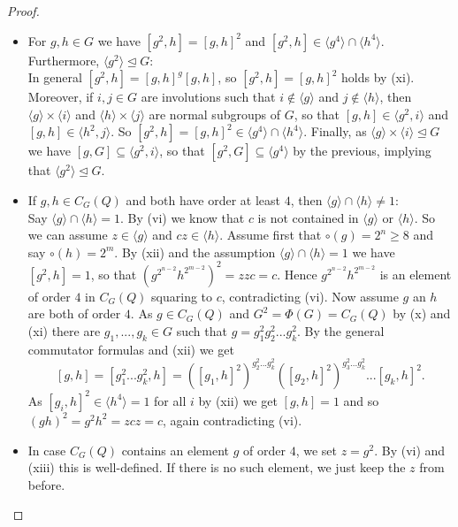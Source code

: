 \documentclass[a4paper,10pt]{amsart}
\theoremstyle{definition}
\theoremstyle{remark}
\begin{document}
\begin{proof}
\begin{itemize}
\item[(xii)] For $g,h \in G$ we have $[g^2,h] = [g,h]^2$ and $[g^2,h] \in \langle g^4 \rangle \cap \langle h^4 \rangle$. Furthermore, $\langle g^2 \rangle \unlhd G$:\\
In general $[g^2,h] = [g,h]^g[g,h]$, so $[g^2,h] = [g,h]^2$ holds by (xi). Moreover, if $i,j \in G$ are involutions such that $i \notin \langle g \rangle$ and $j \notin \langle h \rangle$, then $\langle g \rangle \times \langle i \rangle$ and $\langle h \rangle \times \langle j \rangle$ are normal subgroups of $G$, so that $[g,h] \in \langle g^2, i \rangle$ and $[g,h] \in \langle h^2, j \rangle$. So $[g^2,h] = [g,h]^2 \in \langle g^4 \rangle \cap \langle h^4 \rangle$. Finally, as $\langle g \rangle \times \langle i \rangle \unlhd G$ we have $[g,G] \subseteq \langle g^2, i\rangle$, so that $[g^2,G] \subseteq \langle g^4 \rangle$ by the previous, implying that $\langle g^2 \rangle \unlhd G$.

\item[(xiii)] If $g,h \in C_G(Q)$ and both have order at least $4$, then $\langle g \rangle \cap \langle h \rangle \neq 1$:\\
Say $\langle g \rangle \cap \langle h \rangle =1$. By (vi) we know that $c$ is not contained in $\langle g \rangle$ or $\langle h \rangle$. So we can assume $z \in \langle g \rangle$ and $cz \in \langle h \rangle$. Assume first that $\circ(g) = 2^n \geq 8$ and say $\circ(h) = 2^m$. By (xii) and the assumption $\langle g \rangle \cap \langle h \rangle = 1$ we have $[g^2,h] = 1$, so that $(g^{2^{n-2}}h^{2^{m-2}})^2 = zzc = c$. Hence $g^{2^{n-2}}h^{2^{m-2}}$ is an element of order $4$ in $C_G(Q)$ squaring to $c$, contradicting (vi). Now assume $g$ an $h$ are both of order $4$. As $g \in C_G(Q)$ and $G^2 = \Phi(G) = C_G(Q)$ by (x) and (xi) there are $g_1,...,g_k \in G$ such that $g = g_1^2g_2^2...g_k^2$. By the general commutator formulas and (xii) we get
\[[g,h] = [g_1^2...g_k^2,h] = ([g_1,h]^2)^{g_2^2...g_k^2}([g_2,h]^2)^{g_3^2...g_k^2}...[g_k,h]^2. \]
As $[g_i,h]^2 \in \langle h^4 \rangle = 1$ for all $i$ by (xii) we get $[g,h] = 1$ and so $(gh)^2 = g^2h^2 = zcz = c$, again contradicting (vi).

\item[Convention:] In case $C_G(Q)$ contains an element $g$ of order $4$, we set $z = g^2$. By (vi) and (xiii) this is well-defined. If there is no such element, we just keep the $z$ from before.


\end{itemize}
\end{proof}
\end{document}

